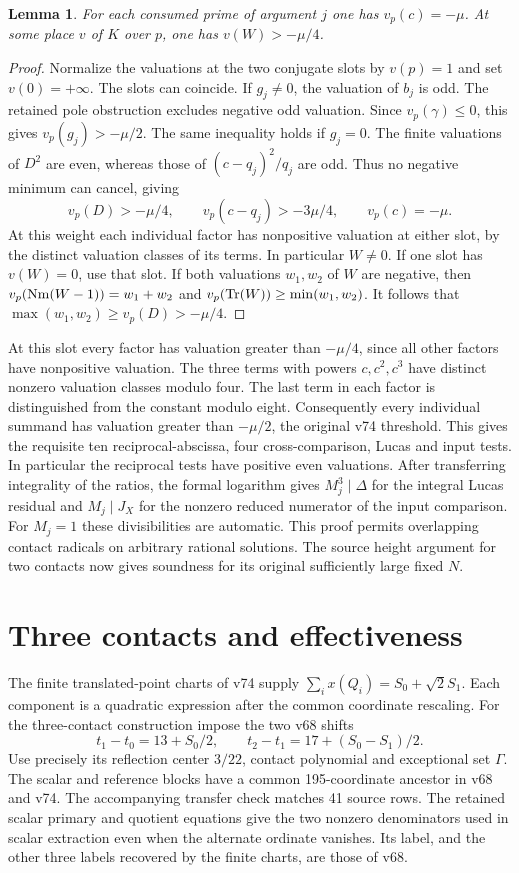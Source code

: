 \documentclass[11pt]{article}
\newtheorem{lemma}{Lemma}
\begin{document}
\begin{lemma}
For each consumed prime of argument $j$ one has $v_p(c)=-\mu$. At some place $v$ of $K$ over $p$, one has $v(W)>-\mu/4$.
\end{lemma}
\begin{proof}
Normalize the valuations at the two conjugate slots by $v(p)=1$ and set $v(0)=+\infty$. The slots can coincide. If $g_j\ne0$, the valuation of $b_j$ is odd. The retained pole obstruction excludes negative odd valuation. Since $v_p(\gamma)\le0$, this gives $v_p(g_j)>-\mu/2$. The same inequality holds if $g_j=0$. The finite valuations of $D^2$ are even, whereas those of $(c-q_j)^2/q_j$ are odd. Thus no negative minimum can cancel, giving
\[
 v_p(D)>-\mu/4,\qquad v_p(c-q_j)>-3\mu/4,\qquad v_p(c)=-\mu.
\]
At this weight each individual factor has nonpositive valuation at either slot, by the distinct valuation classes of its terms. In particular $W\ne0$. If one slot has $v(W)=0$, use that slot. If both valuations $w_1,w_2$ of $W$ are negative, then $v_p(\operatorname{Nm}(W-1))=w_1+w_2$ and $v_p(\operatorname{Tr}(W))\ge\min(w_1,w_2)$. It follows that $\max(w_1,w_2)\ge v_p(D)>-\mu/4$.
\end{proof}

At this slot every factor has valuation greater than $-\mu/4$, since all other factors have nonpositive valuation. The three terms with powers $c,c^2,c^3$ have distinct nonzero valuation classes modulo four. The last term in each factor is distinguished from the constant modulo eight. Consequently every individual summand has valuation greater than $-\mu/2$, the original v74 threshold. This gives the requisite ten reciprocal-abscissa, four cross-comparison, Lucas and input tests. In particular the reciprocal tests have positive even valuations. After transferring integrality of the ratios, the formal logarithm gives $M_j^3\mid\Delta$ for the integral Lucas residual and $M_j\mid J_X$ for the nonzero reduced numerator of the input comparison. For $M_j=1$ these divisibilities are automatic. This proof permits overlapping contact radicals on arbitrary rational solutions. The source height argument for two contacts now gives soundness for its original sufficiently large fixed $N$.

\section{Three contacts and effectiveness}
The finite translated-point charts of v74 supply $\sum_i x(Q_i)=S_0+\sqrt2 S_1$. Each component is a quadratic expression after the common coordinate rescaling. For the three-contact construction impose the two v68 shifts
\[
 t_1-t_0=13+S_0/2,\qquad t_2-t_1=17+(S_0-S_1)/2.
\]
Use precisely its reflection center $3/22$, contact polynomial and exceptional set $\Gamma$. The scalar and reference blocks have a common 195-coordinate ancestor in v68 and v74. The accompanying transfer check matches 41 source rows. The retained scalar primary and quotient equations give the two nonzero denominators used in scalar extraction even when the alternate ordinate vanishes. Its label, and the other three labels recovered by the finite charts, are those of v68.
\end{document}
